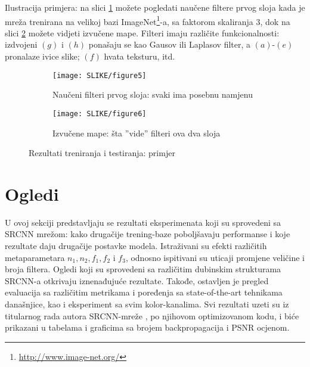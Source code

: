 \documentclass[12pt]{report}
\numberwithin{equation}{section}
\begin{document}
Ilustracija primjera: na slici \ref{fig:trening_sfig1} možete pogledati naučene filtere prvog sloja \cite{main} kada je mreža trenirana na velikoj bazi ImageNet\footnote{\url{http://www.image-net.org/}}-a, sa faktorom skaliranja 3, dok na slici  \ref{fig:trening_sfig2} možete vidjeti izvučene mape. Filteri imaju različite funkcionalnosti: izdvojeni $(g)$ i $(h)$ ponašaju se kao Gausov ili Laplasov filter, a $(a)$-$(e)$ pronalaze ivice slike; $(f)$ hvata teksturu, itd. 

\begin{figure}[h]
\begin{subfigure}{1\textwidth}
  \centering
  \texttt{[image: SLIKE/figure5]}
  \caption{Naučeni filteri prvog sloja: svaki ima posebnu namjenu}
  \label{fig:trening_sfig1}
\end{subfigure}
\begin{subfigure}{0.95\textwidth}
  \centering
  \texttt{[image: SLIKE/figure6]}
  \caption{Izvučene mape: šta ''vide'' filteri ova dva sloja}
  \label{fig:trening_sfig2}
\end{subfigure}
\caption{Rezultati treniranja i testiranja: primjer}
\label{fig:trening}
\end{figure}
 
 
%





\chapter{Ogledi}\label{ch2}

  U ovoj sekciji predstavljaju se rezultati eksperimenata koji su sprovedeni sa SRCNN mrežom: kako drugačije trening-baze poboljšavaju performanse i koje rezultate daju drugačije postavke modela. Istraživani su efekti različitih metaparametara  $n_1, n_2, f_1, f_2$ i $f_3$, odnosno ispitivani su uticaji promjene veličine i broja filtera. Ogledi koji su sprovedeni sa različitim dubinskim strukturama SRCNN-a otkrivaju iznenađujuće rezultate. Takođe, ostavljen je pregled evaluacija sa različitim metrikama i poređenja sa state-of-the-art tehnikama današnjice, kao i eksperiment sa svim kolor-kanalima. Svi rezultati uzeti su iz titularnog rada autora SRCNN-mreže \cite{main}, po njihovom optimizovanom kodu, i biće prikazani u tabelama i  graficima sa brojem backpropagacija i PSNR ocjenom. 
  
\end{document}
